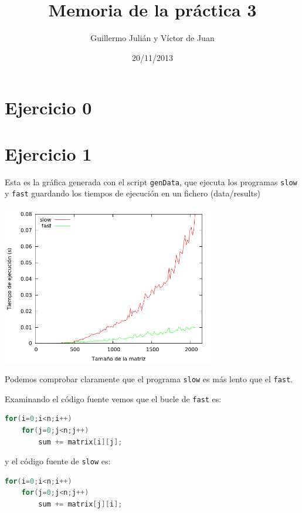 \documentclass[nochap]{apuntes}
\title{Memoria de la práctica 3}
\author{Guillermo Julián y Víctor de Juan}
\date{20/11/2013}
\begin{document}
\pagestyle{plain}
\maketitle

\tableofcontents


\section{Ejercicio 0}

\section{Ejercicio 1}

Esta es la gráfica generada con el script \texttt{genData}, que ejecuta los programas \texttt{slow} y \texttt{fast} guardando los tiempos de ejecución en un fichero (data/results)

\begin{center}
\includegraphics[width=0.7\textwidth]{graficas/fotos/ejercicio1.png}
\end{center}

Podemos comprobar claramente que el programa \texttt{slow} es más lento que el \texttt{fast}.

Examinando el código fuente vemos que el bucle de \texttt{fast} es:

\begin{lstlisting}[language=c]
for(i=0;i<n;i++)
	for(j=0;j<n;j++)
		sum += matrix[i][j];
\end{lstlisting}
y el código fuente de \texttt{slow} es:

\begin{lstlisting}[language=c]
for(i=0;i<n;i++)
	for(j=0;j<n;j++)
		sum += matrix[j][i];
\end{lstlisting}
\end{document}
